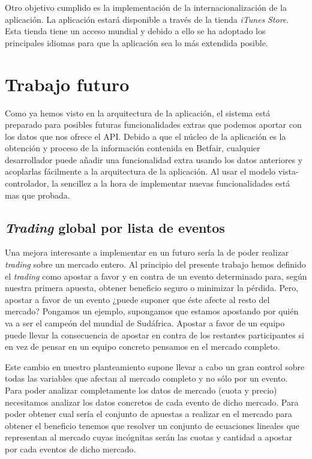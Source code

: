  Otro objetivo cumplido es la implementación de la internacionalización de la aplicación. La aplicación estará disponible a través de la tienda \emph{iTunes} \emph{Store}. Esta tienda tiene un acceso mundial y debido a ello se ha adoptado los principales idiomas para que la aplicación sea lo más extendida posible. 
 
\section{Trabajo futuro}
 Como ya hemos visto en la arquitectura de la aplicación, el sistema está preparado para posibles futuras funcionalidades extras que podemos aportar con los datos que nos ofrece el API. Debido a que el núcleo de la aplicación es la obtención y proceso de la información contenida en Betfair, cualquier desarrollador puede añadir una funcionalidad extra usando los datos anteriores y acoplarlas fácilmente a la arquitectura de la aplicación. Al usar el modelo vista-controlador, la sencillez a la hora de implementar nuevas funcionalidades está mas que probada.
 
\subsection*{\emph{Trading} global por lista de eventos}
 Una mejora interesante a implementar en un futuro sería la de poder realizar \emph{trading} sobre un mercado entero. Al principio del presente trabajo hemos definido el \emph{trading} como apostar a favor y en contra de un evento determinado para, según nuestra primera apuesta, obtener beneficio seguro o minimizar la pérdida. Pero, apostar a favor de un evento ¿puede suponer que éste afecte al resto del mercado? Pongamos un ejemplo, supongamos que estamos apostando por quién va a ser el campeón del mundial de Sudáfrica. Apostar a favor de un equipo puede llevar la consecuencia de apostar en contra de los restantes participantes si en vez de pensar en un equipo concreto pensamos en el mercado completo. 
 
  Este cambio en nuestro planteamiento supone llevar a cabo un gran control sobre todas las variables que afectan al mercado completo y no sólo por un evento. Para poder analizar completamente los datos de mercado (cuota y precio) necesitamos analizar los datos concretos de cada evento de dicho mercado. Para poder obtener cual sería el conjunto de apuestas a realizar en el mercado para obtener el beneficio tenemos que resolver un conjunto de ecuaciones lineales que representan al mercado cuyas incógnitas serán las cuotas y cantidad a apostar por cada eventos de dicho mercado.    
  
